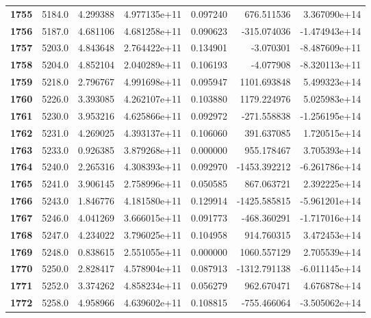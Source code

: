 \documentclass{report}[12pt]
\begin{document}
\begin{center}
\begin{tabular}{lrrrrrr}
\textbf{1755} &         5184.0 &   4.299388 &  4.977135e+11 &    0.097240 &   676.511536 &  3.367090e+14 \\
\textbf{1756} &         5187.0 &   4.681106 &  4.681258e+11 &    0.090623 &  -315.074036 & -1.474943e+14 \\
\textbf{1757} &         5203.0 &   4.843648 &  2.764422e+11 &    0.134901 &    -3.070301 & -8.487609e+11 \\
\textbf{1758} &         5204.0 &   4.852104 &  2.040289e+11 &    0.106193 &    -4.077908 & -8.320113e+11 \\
\textbf{1759} &         5218.0 &   2.796767 &  4.991698e+11 &    0.095947 &  1101.693848 &  5.499323e+14 \\
\textbf{1760} &         5226.0 &   3.393085 &  4.262107e+11 &    0.103880 &  1179.224976 &  5.025983e+14 \\
\textbf{1761} &         5230.0 &   3.953216 &  4.625866e+11 &    0.092972 &  -271.558838 & -1.256195e+14 \\
\textbf{1762} &         5231.0 &   4.269025 &  4.393137e+11 &    0.106060 &   391.637085 &  1.720515e+14 \\
\textbf{1763} &         5233.0 &   0.926385 &  3.879268e+11 &    0.000000 &   955.178467 &  3.705393e+14 \\
\textbf{1764} &         5240.0 &   2.265316 &  4.308393e+11 &    0.092970 & -1453.392212 & -6.261786e+14 \\
\textbf{1765} &         5241.0 &   3.906145 &  2.758996e+11 &    0.050585 &   867.063721 &  2.392225e+14 \\
\textbf{1766} &         5243.0 &   1.846776 &  4.181580e+11 &    0.129914 & -1425.585815 & -5.961201e+14 \\
\textbf{1767} &         5246.0 &   4.041269 &  3.666015e+11 &    0.091773 &  -468.360291 & -1.717016e+14 \\
\textbf{1768} &         5247.0 &   4.234022 &  3.796025e+11 &    0.104958 &   914.760315 &  3.472453e+14 \\
\textbf{1769} &         5248.0 &   0.838615 &  2.551055e+11 &    0.000000 &  1060.557129 &  2.705539e+14 \\
\textbf{1770} &         5250.0 &   2.828417 &  4.578904e+11 &    0.087913 & -1312.791138 & -6.011145e+14 \\
\textbf{1771} &         5252.0 &   3.374262 &  4.858234e+11 &    0.056279 &   962.670471 &  4.676878e+14 \\
\textbf{1772} &         5258.0 &   4.958966 &  4.639602e+11 &    0.108815 &  -755.466064 & -3.505062e+14 \\

\end{tabular}
\end{center}
\end{document}
